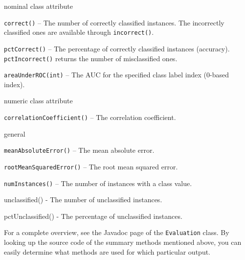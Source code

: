 \begin{tight_itemize}
	\item nominal class attribute
	\begin{tight_itemize}
		\item \texttt{correct()} -- The number of correctly classified
instances. The incorrectly classified ones are available through
\texttt{incorrect()}.
		\item \texttt{pctCorrect()} -- The percentage of correctly classified
instances (accuracy). \texttt{pctIncorrect()} returns the number of
misclassified ones.
		\item \texttt{areaUnderROC(int)} -- The AUC for the specified class
label index (0-based index).
	\end{tight_itemize}

	\item numeric class attribute
	\begin{tight_itemize}
		\item \texttt{correlationCoefficient()} -- The correlation coefficient.
	\end{tight_itemize}

	\item general
	\begin{tight_itemize}
		\item \texttt{meanAbsoluteError()} -- The mean absolute error.
		\item \texttt{rootMeanSquaredError()} -- The root mean squared error.
		\item \texttt{numInstances()} -- The number of instances with a class
value.
		\item unclassified() - The number of unclassified instances.
		\item pctUnclassified() - The percentage of unclassified instances.
	\end{tight_itemize}
\end{tight_itemize}
For a complete overview, see the Javadoc page of the \texttt{Evaluation} class.
By looking up the source code of the summary methods mentioned above, you can
easily determine what methods are used for which particular output.

\newpage

